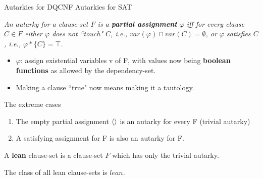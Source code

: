 \documentclass[xcolor=table	]{beamer}
\DeclarePairedDelimiter\ev{\langle}{\rangle}%
\begin{document}
\begin{frame}{Autarkies for DQCNF}
Autarkies for SAT \newline 

\textit{An autarky for a clause-set $F$ is a \textbf{partial assignment} $\varphi$ iff for every clause $C \in F$ either $\varphi$ does not ``touch" $C$, i.e., $var(\varphi) \cap var(C) = \emptyset$, \newline or $\varphi$ satisfies $C$, i.e., $\varphi \ast \{C\} = \top$.\newline
}
\pause 

\begin{itemize}
	\item $\varphi$: 
	assign existential variables v of F, with values now being \newline \textbf{boolean functions} as allowed by the dependency-set.
	\item Making a clause ``true" now means making it a tautology.
\end{itemize}

%
\end{frame}

\begin{frame}{The extreme cases}

\begin{enumerate}
	\item The empty partial assignment $\ev{}$ is an autarky for every F \newline (trivial autarky)
	
	\item A satisfying assignment for F is also an autarky for F. \newline
\end{enumerate}

A \textbf{lean} clause-set is a clause-set $F$ which has
only the trivial autarky. \newline 

The class of all lean clause-sets is $lean$.

\end{frame}
\end{document}

